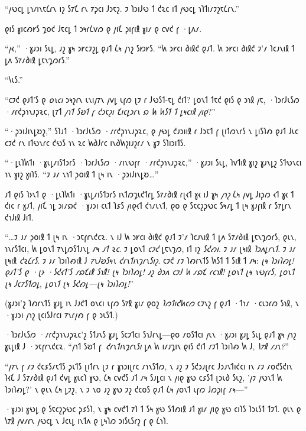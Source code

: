 “𐑢𐑻𐑤𐑛 𐑛𐑪𐑥𐑦𐑯𐑱𐑖𐑩𐑯 𐑦𐑟 𐑕𐑳𐑗 𐑩𐑯 𐑳𐑜𐑤𐑦 𐑓𐑮𐑱𐑟. 𐑲 𐑐𐑮𐑦𐑓𐑻 𐑑 𐑒𐑷𐑤 𐑦𐑑 𐑢𐑻𐑤𐑛 𐑪𐑐𐑑𐑦𐑥𐑲𐑟𐑱𐑖𐑩𐑯.”

𐑞𐑦𐑕 𐑣𐑦𐑤𐑺𐑾𐑕 𐑡𐑴𐑒 𐑓𐑱𐑤𐑛 𐑑 𐑮𐑰𐑩𐑖𐑫𐑼 𐑞 𐑢𐑦𐑗 𐑜𐑦𐑝𐑦𐑙 𐑣𐑦𐑥 𐑞 𐑤𐑫𐑒 𐑝 ·𐑛𐑵𐑥.

“𐑢𐑬,” ·𐑣𐑨𐑮𐑦 𐑕𐑧𐑛, 𐑨𐑟 𐑣𐑰 𐑮𐑾𐑤𐑲𐑟𐑛 𐑞𐑨𐑑 𐑖𐑰 𐑢𐑪𐑟 𐑕𐑽𐑾𐑕. “𐑿 𐑮𐑾𐑤𐑦 𐑔𐑦𐑙𐑒 𐑞𐑨𐑑. 𐑿 𐑮𐑾𐑤𐑦 𐑔𐑦𐑙𐑒 𐑲'𐑥 𐑐𐑤𐑨𐑯𐑦𐑙 𐑑 𐑛𐑵 𐑕𐑳𐑥𐑔𐑦𐑙 𐑛𐑱𐑯𐑡𐑼𐑩𐑕.”

“𐑘𐑧𐑕.”

“𐑤𐑲𐑒 𐑞𐑨𐑑'𐑕 𐑞 \emph{𐑴𐑯𐑤𐑦} 𐑮𐑰𐑟𐑩𐑯 𐑧𐑯𐑦𐑢𐑳𐑯 𐑢𐑫𐑛 𐑧𐑝𐑼 𐑚𐑲 𐑩 𐑓𐑻𐑕𐑑-𐑱𐑛 𐑒𐑦𐑑? 𐑛𐑴𐑯𐑑 𐑑𐑱𐑒 𐑞𐑦𐑕 𐑞 𐑮𐑪𐑙 𐑢𐑱, ·𐑐𐑮𐑩𐑓𐑧𐑕𐑼 ·𐑥𐑩𐑒𐑜𐑪𐑯𐑨𐑜𐑷𐑤, 𐑚𐑳𐑑 \emph{𐑢𐑪𐑑 𐑕𐑹𐑑 𐑝 𐑒𐑮𐑱𐑟𐑦 𐑗𐑦𐑤𐑛𐑮𐑩𐑯 𐑸 𐑿 𐑿𐑕𐑑 𐑑 𐑛𐑰𐑤𐑦𐑙 𐑢𐑦𐑞}?”

“·𐑜𐑮𐑦𐑓𐑦𐑯𐑛𐑹𐑟,” 𐑕𐑐𐑨𐑑 ·𐑐𐑮𐑩𐑓𐑧𐑕𐑼 ·𐑥𐑩𐑒𐑜𐑪𐑯𐑨𐑜𐑷𐑤, 𐑞 𐑢𐑻𐑛 𐑒𐑨𐑮𐑦𐑦𐑙 𐑩 𐑓𐑮𐑱𐑑 𐑝 𐑚𐑦𐑑𐑼𐑯𐑩𐑕 𐑯 𐑛𐑦𐑕𐑐𐑺 𐑞𐑨𐑑 𐑓𐑧𐑤 𐑤𐑲𐑒 𐑩𐑯 𐑦𐑑𐑻𐑯𐑩𐑤 𐑒𐑻𐑕 𐑪𐑯 𐑷𐑤 𐑿𐑔𐑓𐑩𐑤 𐑦𐑯𐑔𐑿𐑟𐑦𐑨𐑟𐑩𐑥 𐑯 𐑣𐑲 𐑕𐑐𐑦𐑮𐑦𐑑𐑕.

“·𐑛𐑧𐑐𐑿𐑑𐑦 ·𐑣𐑧𐑛𐑥𐑦𐑕𐑑𐑮𐑩𐑕 ·𐑐𐑮𐑩𐑓𐑧𐑕𐑼 ·𐑥𐑦𐑯𐑻𐑝𐑩 ·𐑥𐑩𐑒𐑜𐑪𐑯𐑨𐑜𐑷𐑤,” ·𐑣𐑨𐑮𐑦 𐑕𐑧𐑛, 𐑐𐑫𐑑𐑦𐑙 𐑣𐑦𐑟 𐑣𐑨𐑯𐑛𐑟 𐑕𐑑𐑻𐑯𐑤𐑦 𐑪𐑯 𐑣𐑦𐑟 𐑣𐑦𐑐𐑕. “𐑲 𐑨𐑥 𐑯𐑪𐑑 𐑜𐑴𐑦𐑙 𐑑 𐑚𐑰 𐑦𐑯 ·𐑜𐑮𐑦𐑓𐑦𐑯𐑛𐑹…”

𐑨𐑑 𐑞𐑦𐑕 𐑐𐑶𐑯𐑑 𐑞 ·𐑛𐑧𐑐𐑿𐑑𐑦 ·𐑣𐑧𐑛𐑥𐑦𐑕𐑑𐑮𐑩𐑕 𐑦𐑯𐑑𐑼𐑡𐑧𐑒𐑑𐑩𐑛 𐑕𐑳𐑥𐑔𐑦𐑙 𐑩𐑚𐑬𐑑 𐑣𐑬 𐑦𐑓 𐑣𐑰 \emph{𐑢𐑪𐑟} 𐑖𐑰 𐑢𐑫𐑛 𐑓𐑦𐑜𐑼 𐑬𐑑 𐑣𐑬 𐑑 𐑒𐑦𐑤 𐑩 𐑣𐑨𐑑, 𐑢𐑦𐑗 𐑪𐑛 𐑮𐑦𐑥𐑸𐑒 ·𐑣𐑨𐑮𐑦 𐑤𐑧𐑑 𐑐𐑭𐑕 𐑢𐑦𐑞𐑬𐑑 𐑒𐑪𐑥𐑧𐑯𐑑, 𐑞𐑴 𐑞 𐑕𐑱𐑤𐑟𐑜𐑻𐑤 𐑕𐑰𐑥𐑛 𐑑 𐑚𐑰 𐑣𐑨𐑝𐑦𐑙 𐑩 𐑕𐑳𐑛𐑩𐑯 𐑒𐑪𐑓𐑦𐑙 𐑓𐑦𐑑.

“…𐑲 𐑨𐑥 𐑜𐑴𐑦𐑙 𐑑 𐑚𐑰 𐑦𐑯 ·𐑮𐑱𐑝𐑩𐑯𐑒𐑤𐑷. 𐑯 𐑦𐑓 𐑿 𐑮𐑾𐑤𐑦 𐑔𐑦𐑙𐑒 𐑞𐑨𐑑 𐑲'𐑥 𐑐𐑤𐑨𐑯𐑦𐑙 𐑑 𐑛𐑵 𐑕𐑳𐑥𐑔𐑦𐑙 𐑛𐑱𐑯𐑡𐑼𐑩𐑕, 𐑞𐑧𐑯, 𐑪𐑯𐑩𐑕𐑑𐑤𐑦, 𐑿 𐑛𐑴𐑯𐑑 𐑳𐑯𐑛𐑼𐑕𐑑𐑨𐑯𐑛 𐑥𐑰 \emph{𐑨𐑑 𐑷𐑤}. 𐑲 𐑛𐑴𐑯𐑑 \emph{𐑤𐑲𐑒} 𐑛𐑱𐑯𐑡𐑼, 𐑦𐑑 𐑦𐑟 \emph{𐑕𐑒𐑺𐑦}. 𐑲 𐑨𐑥 𐑚𐑰𐑦𐑙 \emph{𐑐𐑮𐑵𐑛𐑩𐑯𐑑}. 𐑲 𐑨𐑥 𐑚𐑰𐑦𐑙 \emph{𐑒𐑷𐑖𐑩𐑕}. 𐑲 𐑨𐑥 𐑐𐑮𐑦𐑐𐑺𐑦𐑙 𐑓 \emph{𐑳𐑯𐑓𐑹𐑕𐑰𐑯 𐑒𐑩𐑯𐑑𐑦𐑯𐑡𐑩𐑯𐑕𐑦𐑟}. 𐑤𐑲𐑒 𐑥𐑲 𐑐𐑺𐑩𐑯𐑑𐑕 𐑿𐑕𐑑 𐑑 𐑕𐑦𐑙 𐑑 𐑥𐑰: \emph{𐑚𐑰 𐑐𐑮𐑦𐑐𐑺𐑛! 𐑞𐑨𐑑'𐑕 𐑞 ·𐑚𐑶 ·𐑕𐑒𐑬𐑑'𐑕 𐑥𐑸𐑗𐑦𐑙 𐑕𐑪𐑙! 𐑚𐑰 𐑐𐑮𐑦𐑐𐑺𐑛! 𐑨𐑟 𐑔𐑮𐑵 𐑤𐑲𐑓 𐑿 𐑥𐑸𐑗 𐑩𐑤𐑪𐑙! 𐑛𐑴𐑯𐑑 𐑚𐑰 𐑯𐑻𐑝𐑩𐑕, 𐑛𐑴𐑯𐑑 𐑚𐑰 𐑓𐑤𐑳𐑕𐑑𐑼𐑛, 𐑛𐑴𐑯𐑑 𐑚𐑰 𐑕𐑒𐑺𐑛—𐑚𐑰 𐑐𐑮𐑦𐑐𐑺𐑛!}”

(𐑣𐑨𐑮𐑦'𐑟 𐑐𐑺𐑩𐑯𐑑𐑕 𐑣𐑨𐑛 𐑦𐑯 𐑓𐑨𐑒𐑑 𐑴𐑯𐑤𐑦 𐑧𐑝𐑼 𐑕𐑳𐑙 𐑣𐑦𐑥 𐑞𐑴𐑟 \emph{𐑐𐑼𐑑𐑦𐑒𐑿𐑤𐑼} 𐑤𐑲𐑯𐑟 𐑝 𐑞𐑨𐑑 ·𐑑𐑪𐑥 ·𐑤𐑧𐑮𐑩𐑼 𐑕𐑪𐑙, 𐑯 ·𐑣𐑨𐑮𐑦 𐑢𐑪𐑟 𐑚𐑤𐑦𐑕𐑓𐑩𐑤𐑦 𐑳𐑯𐑩𐑢𐑺 𐑝 𐑞 𐑮𐑧𐑕𐑑.)

·𐑐𐑮𐑩𐑓𐑧𐑕𐑼 ·𐑥𐑩𐑒𐑜𐑪𐑯𐑨𐑜𐑷𐑤'𐑟 𐑕𐑑𐑨𐑯𐑕 𐑣𐑨𐑛 𐑕𐑤𐑲𐑑𐑤𐑦 𐑕𐑪𐑓𐑩𐑯𐑛—𐑞𐑴 𐑥𐑴𐑕𐑑𐑤𐑦 𐑢𐑧𐑯 ·𐑣𐑨𐑮𐑦 𐑣𐑨𐑛 𐑕𐑧𐑛 𐑞𐑨𐑑 𐑣𐑰 𐑢𐑪𐑟 𐑣𐑧𐑛𐑦𐑙 𐑓 ·𐑮𐑱𐑝𐑩𐑯𐑒𐑤𐑷. “𐑢𐑪𐑑 𐑕𐑹𐑑 𐑝\linebreak\ \emph{𐑒𐑩𐑯𐑑𐑦𐑯𐑡𐑩𐑯𐑕𐑦} 𐑛𐑵 𐑿 𐑦𐑥𐑨𐑡𐑦𐑯 𐑞𐑦𐑕 𐑒𐑦𐑑 𐑥𐑲𐑑 𐑐𐑮𐑦𐑐𐑺 𐑿 𐑓, \emph{𐑘𐑳𐑙 𐑥𐑨𐑯?}”

“𐑢𐑳𐑯 𐑝 𐑥𐑲 𐑒𐑤𐑭𐑕𐑥𐑱𐑑𐑕 𐑜𐑧𐑑𐑕 𐑚𐑦𐑑𐑩𐑯 𐑚𐑲 𐑩 𐑣𐑪𐑮𐑦𐑚𐑩𐑤 𐑥𐑪𐑯𐑕𐑑𐑼, 𐑯 𐑨𐑟 𐑲 𐑕𐑒𐑮𐑨𐑚𐑩𐑤 𐑓𐑮𐑨𐑯𐑑𐑦𐑒𐑤𐑦 𐑦𐑯 𐑥𐑲 𐑥𐑴𐑒𐑕𐑒𐑦𐑯 𐑐𐑬𐑗 𐑓 𐑕𐑳𐑥𐑔𐑦𐑙 𐑞𐑨𐑑 𐑒𐑫𐑛 𐑣𐑧𐑤𐑐 𐑣𐑻, 𐑖𐑰 𐑤𐑫𐑒𐑕 𐑨𐑑 𐑥𐑰 𐑕𐑨𐑛𐑤𐑦 𐑯 𐑢𐑦𐑞 𐑣𐑻 𐑤𐑭𐑕𐑑 𐑚𐑮𐑧𐑔 𐑕𐑧𐑟, '𐑢𐑲 𐑢𐑻𐑯𐑑 𐑿 𐑐𐑮𐑦𐑐𐑺𐑛?' 𐑯 𐑞𐑧𐑯 𐑖𐑰 𐑛𐑲𐑟, 𐑯 𐑲 𐑯𐑴 𐑨𐑟 𐑣𐑻 𐑲𐑟 𐑒𐑤𐑴𐑕 𐑞𐑨𐑑 𐑖𐑰 𐑢𐑴𐑯𐑑 𐑧𐑝𐑼 𐑓𐑼𐑜𐑦𐑝 𐑥𐑰—”

·𐑣𐑨𐑮𐑦 𐑣𐑻𐑛 𐑞 𐑕𐑱𐑤𐑟𐑜𐑻𐑤 𐑜𐑭𐑕𐑐, 𐑯 𐑣𐑰 𐑤𐑫𐑒𐑑 𐑳𐑐 𐑑 𐑕𐑰 𐑣𐑻 𐑕𐑑𐑺𐑦𐑙 𐑨𐑑 𐑣𐑦𐑥 𐑢𐑦𐑞 𐑣𐑻 𐑤𐑦𐑐𐑕 𐑐𐑮𐑧𐑕𐑑 𐑑𐑲𐑑. 𐑞𐑧𐑯 𐑞 𐑘𐑳𐑙 𐑢𐑫𐑥𐑩𐑯 𐑢𐑻𐑤𐑛 𐑯 𐑓𐑤𐑧𐑛 𐑦𐑯𐑑𐑵 𐑞 𐑛𐑰𐑐𐑼 𐑮𐑦𐑕𐑧𐑕𐑩𐑟 𐑝 𐑞 𐑖𐑪𐑐.

